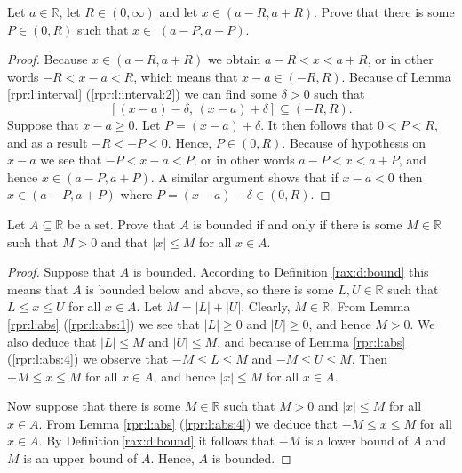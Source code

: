\Newpage
\begin{exercise} %
	Let $a \in \mathbb{R}$, let $R \in (0, \infty)$ and let $x \in(a - R, a + R)$. Prove that there is some $P \in(0, R)$ such that $x \in$ $(a - P, a + P)$.
\end{exercise}

\begin{proof}
	Because $x \in (a - R, a + R)$ we obtain $a - R < x < a + R$, or in other words $-R < x - a < R$, which means that $x - a \in (-R, R)$. Because of Lemma \ref{rpr:l:interval} (\ref{rpr:l:interval:2}) we can find some $\delta > 0$ such that
	$$
		[(x - a) - \delta,\, (x - a) + \delta] \subseteq (-R, R).
	$$
	Suppose that $x - a \geq 0$. Let $P = (x - a) + \delta$. It then follows that $0 < P < R$, and as a result $-R < -P < 0$. Hence, $P \in (0, R)$. Because of hypothesis on $x - a$ we see that $-P < x - a < P$, or in other words $a - P < x < a + P$, and hence $x \in (a - P, a + P)$. A similar argument shows that if $x - a < 0$ then $x \in (a - P, a + P)$ where $P = (x - a) - \delta \in (0, R)$.
\end{proof}


\addtocounter{exercise}{1}
\Newpage
\begin{exercise} %
	Let $A \subseteq \mathbb{R}$ be a set. Prove that $A$ is bounded if and only if there is some $M \in \mathbb{R}$ such that $M > 0$ and that $|x| \leq M$ for all $x \in A$.
\end{exercise}

\begin{proof}
	Suppose that $A$ is bounded. According to Definition \ref{rax:d:bound} this means that $A$ is bounded below and above, so there is some $L, U \in \mathbb{R}$ such that $L \leq x \leq U$ for all $x \in A$. Let $M = |L| + |U|$. Clearly, $M \in \mathbb{R}$. From Lemma \ref{rpr:l:abs} (\ref{rpr:l:abs:1}) we see that $|L| \geq 0$ and $|U| \geq 0$, and hence $M > 0$. We also deduce that $|L| \leq M$ and $|U| \leq M$, and because of Lemma \ref{rpr:l:abs} (\ref{rpr:l:abs:4}) we observe that $-M \leq L \leq M$ and $-M \leq U \leq M$. Then $-M \leq x \leq M$ for all $x \in A$, and hence $|x| \leq M$ for all $x \in A$.

	Now suppose that there is some $M \in \mathbb{R}$ such that $M > 0$ and $|x| \leq M$ for all $x \in A$. From Lemma \ref{rpr:l:abs} (\ref{rpr:l:abs:4}) we deduce that $-M \leq x \leq M$ for all $x \in A$. By Definition\,\ref{rax:d:bound} it follows that $-M$ is a lower bound of $A$ and $M$ is an upper bound of $A$. Hence, $A$ is bounded.
\end{proof}


